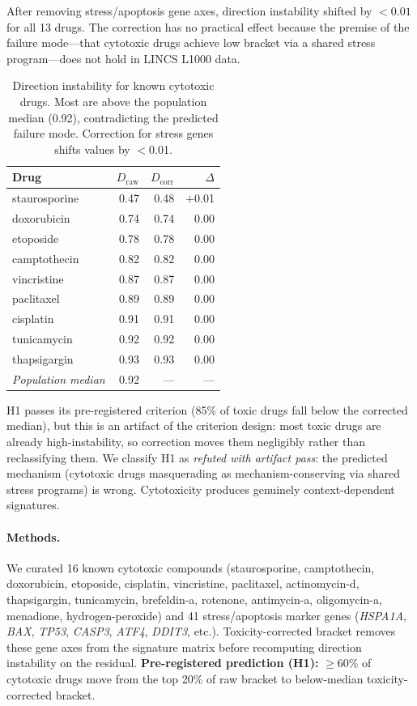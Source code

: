 \documentclass{article}
\begin{document}
After removing stress/apoptosis gene axes, direction instability shifted by
$<0.01$ for all 13 drugs. The correction has no practical effect because the
premise of the failure mode---that cytotoxic drugs achieve low bracket via
a shared stress program---does not hold in LINCS L1000 data.

\begin{table}[h]
\centering
\caption{Direction instability for known cytotoxic drugs. Most are above the
population median (0.92), contradicting the predicted failure mode.
Correction for stress genes shifts values by $<$0.01.}
\label{tab:toxic}
\small
\begin{tabular}{lrrr}
\toprule
Drug & $D_{\text{raw}}$ & $D_{\text{corr}}$ & $\Delta$ \\
\midrule
staurosporine & 0.47 & 0.48 & $+$0.01 \\
doxorubicin & 0.74 & 0.74 & 0.00 \\
etoposide & 0.78 & 0.78 & 0.00 \\
camptothecin & 0.82 & 0.82 & 0.00 \\
vincristine & 0.87 & 0.87 & 0.00 \\
paclitaxel & 0.89 & 0.89 & 0.00 \\
cisplatin & 0.91 & 0.91 & 0.00 \\
tunicamycin & 0.92 & 0.92 & 0.00 \\
thapsigargin & 0.93 & 0.93 & 0.00 \\
\midrule
\emph{Population median} & 0.92 & --- & --- \\
\bottomrule
\end{tabular}
\end{table}

H1 passes its pre-registered criterion (85\% of toxic drugs fall below
the corrected median), but this is an artifact of the criterion design: most
toxic drugs are already high-instability, so correction moves them
negligibly rather than reclassifying them. We classify H1 as
\emph{refuted with artifact pass}: the predicted mechanism (cytotoxic
drugs masquerading as mechanism-conserving via shared stress programs) is
wrong. Cytotoxicity produces genuinely context-dependent signatures.

\paragraph{Methods.}
We curated 16 known cytotoxic compounds (staurosporine, camptothecin,
doxorubicin, etoposide, cisplatin, vincristine, paclitaxel, actinomycin-d,
thapsigargin, tunicamycin, brefeldin-a, rotenone, antimycin-a, oligomycin-a,
menadione, hydrogen-peroxide) and 41 stress/apoptosis marker genes
(\emph{HSPA1A}, \emph{BAX}, \emph{TP53}, \emph{CASP3}, \emph{ATF4},
\emph{DDIT3}, etc.). Toxicity-corrected bracket removes these gene axes from
the signature matrix before recomputing direction instability on the residual.
\textbf{Pre-registered prediction (H1):} $\geq$60\% of cytotoxic drugs move
from the top 20\% of raw bracket to below-median toxicity-corrected bracket.
\end{document}

